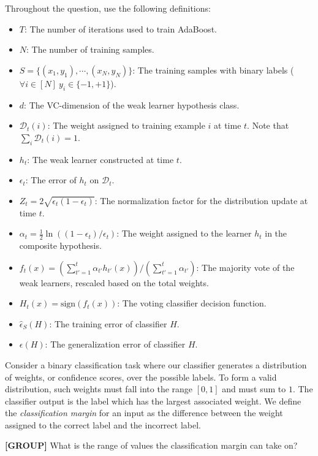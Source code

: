 \documentclass[11pt,addpoints,answers]{exam}
\newcommand{\group}{\textbf{[GROUP]} }
\newcommand{\trainerr}[1]{\hat{\epsilon}_S \left(#1\right)}
\newcommand{\generr}[1]{\epsilon \left(#1\right)}
\newcommand{\D}{\mathcal{D}}
\newcommand{\sign}{\text{sign}}
\begin{document}
\begin{questions}
\begin{parts}
Throughout the question, use the following definitions:
\begin{itemize}
    \item $T$: The number of iterations used to train AdaBoost.
    \item $N$: The number of training samples.
    \item $S = \{(x_1, y_1), \cdots, (x_N, y_N)\}$: 
        The training samples with binary labels ($\forall i \in [N] \ y_i \in \{-1, +1\}$).
    \item $d$: The VC-dimension of the weak learner hypothesis class.
    \item $\D_t (i)$: The weight assigned to training example $i$ at time $t$.
        Note that $\sum_i \D_t (i) = 1$.
    \item $h_t$: The weak learner constructed at time $t$.
    \item $\epsilon_t$: The error of $h_t$ on $\D_t$.
    \item $Z_t = 2\sqrt{\epsilon_t (1 - \epsilon_t)}$: The normalization factor for the distribution update at time $t$.
    \item $\alpha_t = \frac{1}{2} \ln ((1 - \epsilon_t)/\epsilon_t)$: The weight assigned to the learner $h_t$ in the composite hypothesis.
    \item $f_t (x) = \left( \sum_{t'=1}^{t} \alpha_{t'} h_{t'} (x) \right) / \left( \sum_{t'=1}^{t} \alpha_{t'} \right)$: 
        The majority vote of the weak learners, rescaled based on the total weights.
    \item $H_{t} (x) = \sign(f_{t} (x))$: The voting classifier decision function.
    \item $\trainerr{H}$: The training error of classifier $H$.
    \item $\generr{H}$: The generalization error of classifier $H$.
\end{itemize}

Consider a binary classification task where our classifier generates a distribution of weights, or confidence scores, over the possible labels.
To form a valid distribution, such weights must fall into the range $[0, 1]$ and must sum to $1$.
The classifier output is the label which has the largest associated weight.
We define the \textit{classification margin} for an input as the difference between the weight assigned to the correct label and the incorrect label.

\begin{subparts}
\subpart[1] \group What is the range of values the classification margin can take on?


\end{subparts}
\end{parts}
\end{questions}
\end{document}
